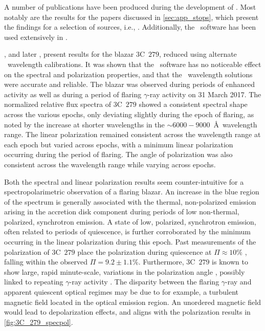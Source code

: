A number of publications have been produced during the development of \stops.
Most notably are the results for the papers discussed in \autoref{sec:app_stops}, which present the findings for a selection of sources, i.e., \citet{Buckley191221B, Cooper_HEASA2021, Cooper_HEASA2022, Schutte4C0102}.
Additionally, the \stops\ software has been used extensively in \citet{Barnard_HEASA2021, Barnard_2024, Barnard_thesis}.


\citet{Cooper_HEASA2021}, and later \citet{Cooper_HEASA2022}, present results for the blazar $3$C~$279$, reduced using alternate \iraf\ wavelength calibrations.
It was shown that the \stops\ software has no noticeable effect on the spectral and polarization properties, and that the \iraf\ wavelength solutions were accurate and reliable.
The blazar was observed during periods of enhanced activity as well as during a period of flaring $\gamma$-ray activity on 31 March 2017.
The normalized relative flux spectra of $3$C~$279$ showed a consistent spectral shape across the various epochs, only deviating slightly during the epoch of flaring, as noted by the increase at shorter wavelengths in the $\sim 6000 - 9000$~\AA\ wavelength range.
The linear polarization remained consistent across the wavelength range at each epoch but varied across epochs, with a minimum linear polarization occurring during the period of flaring.
The angle of polarization was also consistent across the wavelength range while varying across epochs.

Both the spectral and linear polarization results seem counter-intuitive for a spectropolarimetric observation of a flaring blazar.
An increase in the blue region of the spectrum is generally associated with the thermal, non-polarized emission arising in the accretion disk component during periods of low non-thermal, polarized, synchrotron emission.
A state of low, polarized, synchrotron emission, often related to periods of quiescence, is further corroborated by the minimum occurring in the linear polarization during this epoch.
Past measurements of the polarization of 3C~$279$ place the polarization during quiescence at $\Pi \approx 10 \%$ \citep[see e.g., ][]{3C279_xray}, falling within the observed $\Pi = 9.2 \pm 1.1\%$.
Furthermore, 3C~$279$ is known to show large, rapid minute-scale, variations in the polarization angle \citep{3C279_var}, possibly linked to repeating $\gamma$-ray activity \citep{3C279_repeat}.
The disparity between the flaring $\gamma$-ray and apparent quiescent optical regimes may be due to for example, a turbulent magnetic field located in the optical emission region.
An unordered magnetic field would lead to depolarization effects, and aligns with the polarization results in \autoref{fig:3C_279_specpol}.

